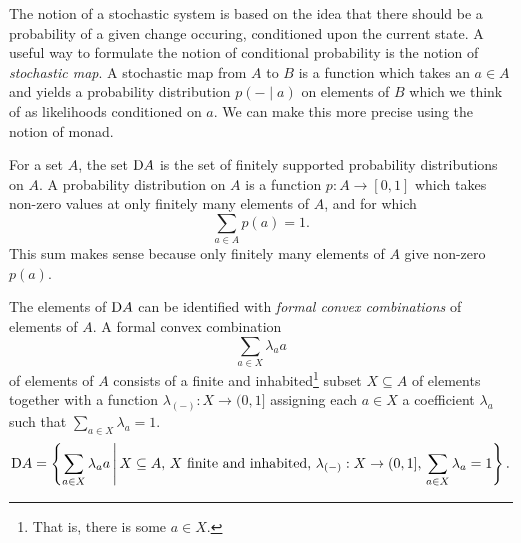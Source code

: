 \documentclass[DynamicalBook]{subfiles}
\begin{document}
The notion of a stochastic system is based on the idea that there should be a
probability of a given change occuring, conditioned upon the current state. A
useful way to formulate the notion of conditional probability is the notion of
\emph{stochastic map}. A stochastic map from $A$ to $B$ is a function
which takes an $a \in A$ and yields a probability distribution $p(- \mid a)$ on
elements of $B$ which we think of as likelihoods conditioned on $a$. We can make
this more precise using the notion of monad.

\begin{definition}\label{def.set_of_probs}
  For a set $A$, the set $\mathrm{D} A$ is the set of finitely supported
  probability distributions on $A$. A probability distribution on $A$ is a
  function $p : A \to [0, 1]$ which takes non-zero values at only finitely many
  elements of $A$, and for which
  $$\sum_{a \in A} p(a) = 1.$$
This sum makes sense because only finitely many elements of $A$ give non-zero $p(a)$.
  
  The elements of $\mathrm{D} A$ can be identified with  
  \emph{formal convex combinations} of elements of $A$. A formal convex
  combination
$$\sum_{a \in X} \lambda_a a$$
  of elements of $A$ consists of a finite and inhabited\footnote{That is, there
    is some $a \in X$.} subset $X \subseteq A$ of
  elements together with a function $\lambda_{(-)} : X \to (0,1]$ assigning each
  $a \in X$ a coefficient $\lambda_a$ such that $\sum_{a \in X} \lambda_a = 1$.
  \[
\mathrm{D} A = \left\{ \sum_{a \in X} \lambda_a a \,\middle|\, X \subseteq A,\,\mbox{$X$
  finite and inhabited},\, \lambda_{(-)} : X \to (0, 1],\, \sum_{a \in X} \lambda_a = 1\right\}.
  \]
\end{definition}
\end{document}
